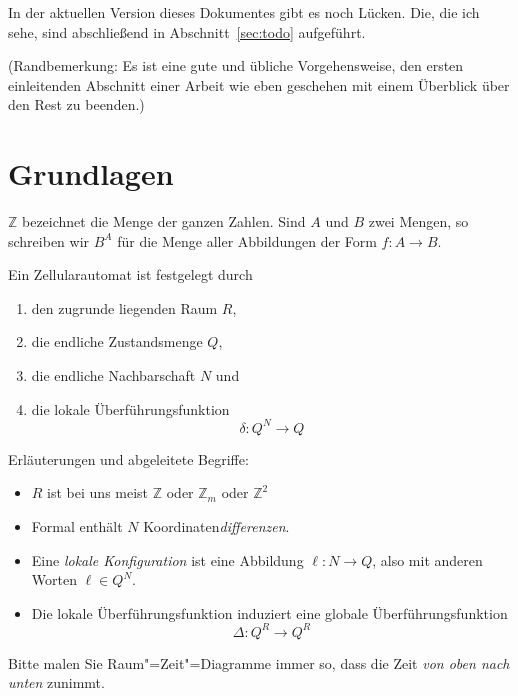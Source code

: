 \documentclass[11pt]{article}
\newcommand{\Z}{\mathbb{Z}}
\begin{document}
In der aktuellen Version dieses Dokumentes gibt es noch Lücken. Die, die ich
sehe, sind abschließend in Abschnitt~\ref{sec:todo} aufgeführt.

(Randbemerkung: Es ist eine gute und übliche Vorgehensweise, den ersten
einleitenden Abschnitt einer Arbeit wie eben geschehen mit einem Überblick
über den Rest zu beenden.)

\section{Grundlagen}
\label{sec:grundlagen}

$\Z$ bezeichnet die Menge der ganzen Zahlen. Sind $A$ und $B$ zwei Mengen, so
schreiben wir $B^A$ für die Menge aller Abbildungen der Form $f \colon A\to
B$.

Ein Zellularautomat ist festgelegt durch
%
\begin{enumerate}[noitemsep]
\item den zugrunde liegenden Raum $R$,
\item die endliche Zustandsmenge $Q$,
\item die endliche Nachbarschaft $N$ und
\item die lokale Überführungsfunktion
  \[
  \delta: Q^N \to Q
  \]
\end{enumerate}
%
Erläuterungen und abgeleitete Begriffe:
%
\begin{itemize}[noitemsep]
\item $R$ ist bei uns meist $\Z$ oder $\Z_m$ oder $\Z^2$
\item Formal enthält $N$ Koordinaten\emph{differenzen}.
\item Eine \emph{lokale Konfiguration} ist eine Abbildung $\ell:N\to Q$, also
  mit anderen Worten $\ell\in Q^N$.
\item Die lokale Überführungsfunktion induziert eine globale
  Überführungsfunktion
  \[
  \Delta: Q^R \to Q^R
  \]
\end{itemize}
%
Bitte malen Sie Raum"=Zeit"=Diagramme immer so, dass die Zeit \emph{von oben
  nach unten} zunimmt.


\end{document}
